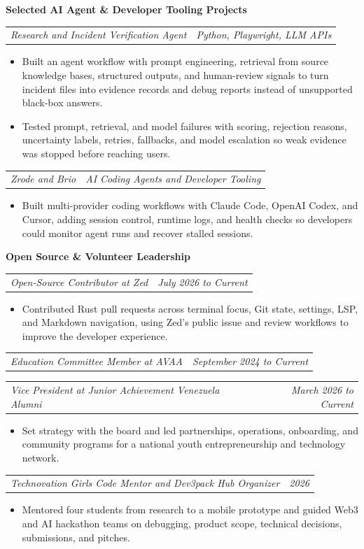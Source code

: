 \documentclass[10pt,letterpaper]{article}
\makeatletter
\newcommand{\bodyfont}{\fontsize{10.5}{15.75}\selectfont}
\newcommand{\sectiontitle}[1]{%
  \vspace{7pt}
  {\bodyfont\textbf{#1}}\par
  \nopagebreak[4]
  \vspace{4pt}
}
\newcommand{\roleline}[2]{%
  \begin{tabularx}{\textwidth}{@{}Xr@{}}
    \bodyfont\textit{#1} & \bodyfont\textit{#2}
  \end{tabularx}
  \nopagebreak[4]
  \vspace{1pt}
}
\makeatother
\begin{document}
\sectiontitle{Selected AI Agent \& Developer Tooling Projects}

\roleline{Research and Incident Verification Agent}{Python, Playwright, LLM APIs}
\begin{itemize}
  \item Built an agent workflow with prompt engineering, retrieval from source knowledge bases, structured outputs, and human-review signals to turn incident files into evidence records and debug reports instead of unsupported black-box answers.
  \item Tested prompt, retrieval, and model failures with scoring, rejection reasons, uncertainty labels, retries, fallbacks, and model escalation so weak evidence was stopped before reaching users.
\end{itemize}

\vspace{3pt}
\roleline{Zrode and Brio}{AI Coding Agents and Developer Tooling}
\begin{itemize}
  \item Built multi-provider coding workflows with Claude Code, OpenAI Codex, and Cursor, adding session control, runtime logs, and health checks so developers could monitor agent runs and recover stalled sessions.
\end{itemize}

\sectiontitle{Open Source \& Volunteer Leadership}

\roleline{Open-Source Contributor at Zed}{July 2026 to Current}
\begin{itemize}
  \item Contributed Rust pull requests across terminal focus, Git state, settings, LSP, and Markdown navigation, using Zed's public issue and review workflows to improve the developer experience.
\end{itemize}

\vspace{3pt}
\roleline{Education Committee Member at AVAA}{September 2024 to Current}

\vspace{3pt}
\roleline{Vice President at Junior Achievement Venezuela Alumni}{March 2026 to Current}
\begin{itemize}
  \item Set strategy with the board and led partnerships, operations, onboarding, and community programs for a national youth entrepreneurship and technology network.
\end{itemize}

\vspace{3pt}
\roleline{Technovation Girls Code Mentor and Dev3pack Hub Organizer}{2026}
\begin{itemize}
  \item Mentored four students from research to a mobile prototype and guided Web3 and AI hackathon teams on debugging, product scope, technical decisions, submissions, and pitches.
\end{itemize}
\end{document}
